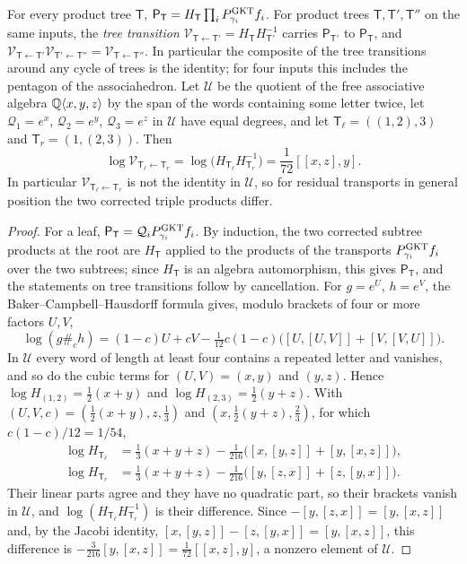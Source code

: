 \begin{proposition}
\label{thm:residual-coherence}
For every product tree $\mathsf T$,
$\mathsf P_{\mathsf T}=H_{\mathsf T}\prod_iP^{\mathrm{GKT}}_{\gamma_i}f_i$.
For product trees $\mathsf T,\mathsf T',\mathsf T''$ on the same inputs, the
\emph{tree transition}
$\mathcal V_{\mathsf T\leftarrow\mathsf T'}=H_{\mathsf T}H_{\mathsf T'}^{-1}$
carries $\mathsf P_{\mathsf T'}$ to $\mathsf P_{\mathsf T}$, and
$\mathcal V_{\mathsf T\leftarrow\mathsf T'}
\mathcal V_{\mathsf T'\leftarrow\mathsf T''}
=\mathcal V_{\mathsf T\leftarrow\mathsf T''}$.
In particular the composite of the tree transitions around any cycle of
trees is the identity; for four inputs this includes the pentagon of the
associahedron.  Let $\mathcal U$ be the quotient of the free associative
algebra $\mathbb Q\langle x,y,z\rangle$ by the span of the words containing some
letter twice, let $\mathcal Q_1=e^x$, $\mathcal Q_2=e^y$, $\mathcal Q_3=e^z$
in $\mathcal U$ have equal degrees, and let $\mathsf T_\ell=((1,2),3)$ and
$\mathsf T_r=(1,(2,3))$.  Then
\begin{equation}\label{eq:first-associator}
 \log\mathcal V_{\mathsf T_\ell\leftarrow\mathsf T_r}
 =\log\bigl(H_{\mathsf T_\ell}H_{\mathsf T_r}^{-1}\bigr)
 =\frac1{72}[[x,z],y].
\end{equation}
In particular $\mathcal V_{\mathsf T_\ell\leftarrow\mathsf T_r}$ is not the
identity in $\mathcal U$, so for residual transports in general position the
two corrected triple products differ.
\end{proposition}

\begin{proof}
For a leaf, $\mathsf P_{\mathsf T}=\mathcal Q_iP^{\mathrm{GKT}}_{\gamma_i}f_i$.  By
induction, the two corrected subtree products at the root are $H_{\mathsf T}$
applied to the products of the transports $P^{\mathrm{GKT}}_{\gamma_i}f_i$ over
the two subtrees; since
$H_{\mathsf T}$ is an algebra automorphism, this gives
$\mathsf P_{\mathsf T}$, and the statements on tree transitions follow by
cancellation.  For $g=e^U$, $h=e^V$, the Baker--Campbell--Hausdorff formula
gives, modulo brackets of four or more factors $U,V$,
\[
 \log(g\mathbin{\#_c}h)
 =(1-c)U+cV-\tfrac1{12}c(1-c)\bigl([U,[U,V]]+[V,[V,U]]\bigr).
\]
In $\mathcal U$ every word of length at least four contains a repeated
letter and vanishes, and so do the cubic terms for $(U,V)=(x,y)$ and
$(y,z)$.  Hence $\log H_{(1,2)}=\frac12(x+y)$ and
$\log H_{(2,3)}=\frac12(y+z)$.  With $(U,V,c)=(\frac12(x+y),z,\frac13)$ and
$(x,\frac12(y+z),\frac23)$, for which $c(1-c)/12=1/54$,
\begin{align*}
 \log H_{\mathsf T_\ell}
 &=\tfrac13(x+y+z)-\tfrac1{216}\bigl([x,[y,z]]+[y,[x,z]]\bigr),\\
 \log H_{\mathsf T_r}
 &=\tfrac13(x+y+z)-\tfrac1{216}\bigl([y,[z,x]]+[z,[y,x]]\bigr).
\end{align*}
Their linear parts agree and they have no quadratic part, so their brackets
vanish in $\mathcal U$, and $\log(H_{\mathsf T_\ell}H_{\mathsf T_r}^{-1})$ is
their difference.  Since $-[y,[z,x]]=[y,[x,z]]$ and, by the Jacobi identity,
$[x,[y,z]]-[z,[y,x]]=[y,[x,z]]$, this difference is
$-\frac3{216}[y,[x,z]]=\frac1{72}[[x,z],y]$, a nonzero element of
$\mathcal U$.
\end{proof}

